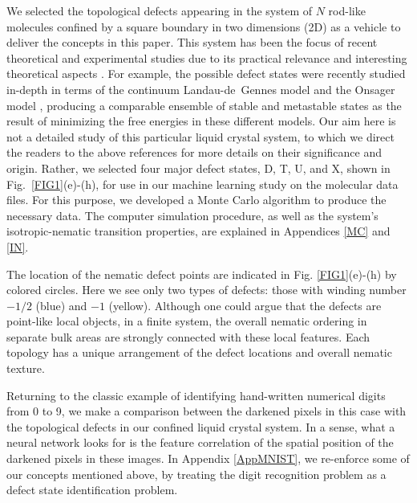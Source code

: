 We selected the topological defects appearing in the system of $N$ rod-like molecules confined by a square boundary in two dimensions (2D) as a
vehicle to deliver the concepts in this paper. This system has been the focus of recent theoretical and experimental studies due to its practical relevance \cite{Galanis2006,Mulder2011,Lewis2014,Cortes2017} and interesting theoretical aspects \cite{Tsakonas2007,Luo2012,Chen2013,Mulder2015,Lewis2014,robinson2017,yao}.
For example, %
the possible defect states were recently studied in-depth in terms of
the continuum Landau-de~Gennes model \cite{robinson2017} and
the Onsager model \cite{yao},
producing a comparable ensemble of stable and metastable states as
the result of minimizing the free energies in
these different models.
Our aim here is not a detailed study of this particular liquid crystal system, to which we direct the readers to the above references for more details on their significance and origin.
Rather, we selected four major defect states, D, T, U, and X, shown in Fig.\ \ref{FIG1}(e)-(h), for use in our machine learning study on the molecular data files. For this purpose,
we developed a Monte Carlo algorithm to produce the necessary data.
The computer simulation procedure, as well as the system's isotropic-nematic transition properties, are explained in Appendices \ref{MC} and \ref{IN}.

The location of the nematic defect points are indicated in Fig. \ref{FIG1}(e)-(h) by colored circles. Here we see only two types of defects: those with winding number $-1/2$ (blue) and $-1$ (yellow). Although one could argue that the defects are point-like local objects, in a finite system, the overall nematic ordering in separate bulk areas are strongly connected with these local features. Each topology has a unique arrangement of the defect locations and overall nematic texture.



Returning to the classic example of identifying hand-written numerical digits from 0 to 9, we make a comparison between the darkened pixels in this case with the topological defects in our confined liquid crystal system. In a sense, what a neural network looks for is the feature correlation of the spatial position of the darkened pixels in these images. In Appendix \ref{AppMNIST}, we re-enforce some of our concepts mentioned above, by treating the digit recognition problem as a defect state identification problem.

